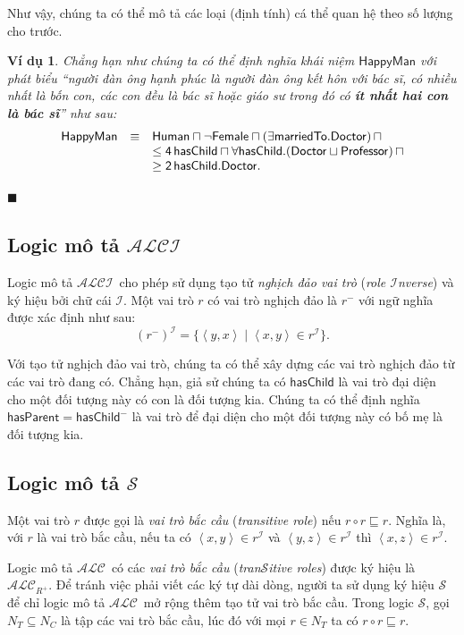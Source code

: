 \documentclass[12pt,a4paper]{report}
\newtheorem{Example}{Ví dụ}[chapter]
\newcommand{\myend}{\mbox{}\hfill\mbox{{\scriptsize$\!\blacksquare$}}}
\newcommand{\mand}{\sqcap}
\newcommand{\mor}{\sqcup}
\newcommand{\V}{\forall}
\newcommand{\E}{\exists}
\newcommand{\ALC}{$\mathcal{ALC}$}
\newcommand{\ALCI}{$\mathcal{ALCI}$}
\newcommand{\mI}{\mathcal{I}}
\newcommand{\mS}{\mathcal{S}}
\def\tuple#1{\left\langle#1\right\rangle}
\begin{document}
Như vậy, chúng ta có thể mô tả các loại (định tính) cá thể quan hệ theo số lượng cho trước. 
\begin{Example}
Chẳng hạn như chúng ta có thể định nghĩa khái niệm $\mathsf{HappyMan}$ với phát biểu ``người đàn ông hạnh phúc là người đàn ông kết hôn với bác sĩ, có nhiều nhất là bốn con, các con đều là bác sĩ hoặc giáo sư trong đó có \textbf{ít nhất hai con là bác sĩ}'' như sau:
\[
  \begin{array}{r c l}
     \mathsf{HappyMan} & \equiv & \mathsf{Human \mand \neg Female \mand (\E marriedTo.Doctor)\, \mand}\\
     & & \mathsf{\leq 4\,hasChild \mand \V hasChild.(Doctor \mor Professor)\, \mand}\\
     & & \mathsf{\geq 2\,hasChild.Doctor}.
  \end{array}
\]
\end{Example}
\vspace{-5ex}
\myend

\subsection{Logic mô tả \ALCI}
Logic mô tả \ALCI\ cho phép sử dụng tạo tử \textit{nghịch đảo vai trò} (\textit{role $\mathcal{I}$nverse}) và ký hiệu bởi chữ cái $\mathcal{I}$. Một vai trò $r$ có vai trò nghịch đảo là $r^-$ với ngữ nghĩa được xác định như sau:
$$(r^-)^\mI = \{\tuple{y, x} \mid \tuple{x, y} \in r^\mI \}.$$

Với tạo tử nghịch đảo vai trò, chúng ta có thể xây dựng các vai trò nghịch đảo từ các vai trò đang có. Chẳng hạn, giả sử chúng ta có $\mathsf{hasChild}$ là vai trò đại diện cho một đối tượng này có con là đối tượng kia. Chúng ta có thể định nghĩa $\mathsf{hasParent = hasChild^-}$ là vai trò để đại diện cho một đối tượng này có bố mẹ là đối tượng kia.

\subsection{Logic mô tả $\mS$}
Một vai trò $r$ được gọi là \textit{vai trò bắc cầu} (\textit{transitive role}) nếu $r \circ r \sqsubseteq r$. Nghĩa là, với $r$ là vai trò bắc cầu, nếu ta có $\tuple{x, y} \in r^\mI$ và $\tuple{y, z} \in r^\mI$ thì $\tuple{x, z} \in r^\mI$.

Logic mô tả \ALC\ có các \textit{vai trò bắc cầu} (\textit{tran$\mS$itive roles}) được ký hiệu là $\mathcal{ALC}_{R^+}$. Để tránh việc phải viết các ký tự dài dòng, người ta sử dụng ký hiệu $\mS$~\cite{ref:Horrock00} để chỉ logic mô tả \ALC\ mở rộng thêm tạo tử vai trò bắc cầu. Trong logic $\mS$, gọi $N_T \subseteq N_C$ là tập các vai trò bắc cầu, lúc đó với mọi $r \in N_T$ ta có $r \circ r \sqsubseteq r$. 
\end{document}
